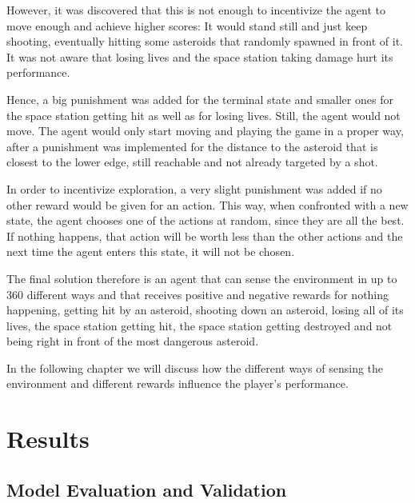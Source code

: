 \documentclass[a4paper,10pt]{article}
\begin{document}
However, it was discovered that this is not enough to incentivize the agent to move enough and achieve higher scores: It would stand still and just keep shooting, eventually hitting some asteroids that randomly spawned in front of it.
It was not aware that losing lives and the space station taking damage hurt its performance.

Hence, a big punishment was added for the terminal state and smaller ones for the space station getting hit as well as for losing lives.
Still, the agent would not move.
The agent would only start moving and playing the game in a proper way, after a punishment was implemented for the distance to the asteroid that is closest to the lower edge, still reachable and not already targeted by a shot.

In order to incentivize exploration, a very slight punishment was added if no other reward would be given for an action.
This way, when confronted with a new state, the agent chooses one of the actions at random, since they are all the best.
If nothing happens, that action will be worth less than the other actions and the next time the agent enters this state, it will not be chosen.

The final solution therefore is an agent that can sense the environment in up to $360$ different ways and that receives positive and negative rewards for nothing happening, getting hit by an asteroid, shooting down an asteroid, losing all of its lives, the space station getting hit, the space station getting destroyed and not being right in front of the most dangerous asteroid.

In the following chapter we will discuss how the different ways of sensing the environment and different rewards influence the player's performance.
\section{Results}

\subsection{Model Evaluation and Validation}
\end{document}
